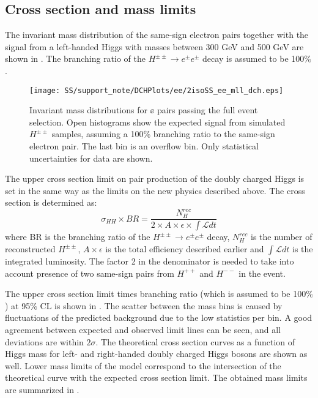 
\subsection{Cross section and mass limits}

The invariant mass distribution of the same-sign electron pairs together with the signal from a left-handed Higgs 
with masses between 300 GeV and 500 GeV are shown in .
The branching ratio of the $H^{\pm\pm} \to e^{\pm}e^{\pm}$ decay is assumed to be 100$\%$.

\begin{figure}[h]
\begin{center}
\texttt{[image: SS/support\_note/DCHPlots/ee/2isoSS\_ee\_mll\_dch.eps]}
\caption{Invariant mass distributions for $\ee$ pairs passing the full event selection. 
Open histograms show the expected signal from simulated $H^{\pm\pm}$ samples,
assuming a 100\% branching ratio to the same-sign electron pair. The last bin is an overflow bin. Only statistical uncertainties for data are shown.}
\label{fig:signal_mass_v2}
\end{center}
\end{figure}

The upper cross section limit on pair production of the doubly charged Higgs is set in the same way as the limits on the new physics described above.
The cross section is determined as:
\begin{equation}
 \sigma_{HH}\times BR =\frac{N_{H}^{rec}}{2\times A\times \epsilon \times \int \mathscr{L} dt}
\end{equation}
where BR is the branching ratio of the $H^{\pm\pm} \to e^{\pm}e^{\pm}$ decay, 
$N_{H}^{rec}$ is the number of reconstructed $H^{\pm\pm}$, $A\times \epsilon$ is the total efficiency described earlier and
$\int \mathscr{L} dt$ is the integrated luminosity.
The factor 2 in the denominator is needed to take into account presence of two same-sign pairs from $H^{++}$ and $H^{--}$ in the event.

The upper cross section limit times branching ratio (which is assumed to be 100$\%$) at 95$\%$ CL is shown in .
The scatter between the mass bins is caused by fluctuations of the predicted background due to the low statistics per bin.
A good agreement between expected and observed limit lines can be seen, and all deviations are within $2\sigma$.
The theoretical cross section curves as a function of Higgs mass for left- and right-handed doubly charged Higgs bosons 
are shown as well.
Lower mass limits of the model correspond to the intersection of the theoretical curve with the expected cross section limit. The obtained
mass limits are summarized in .

